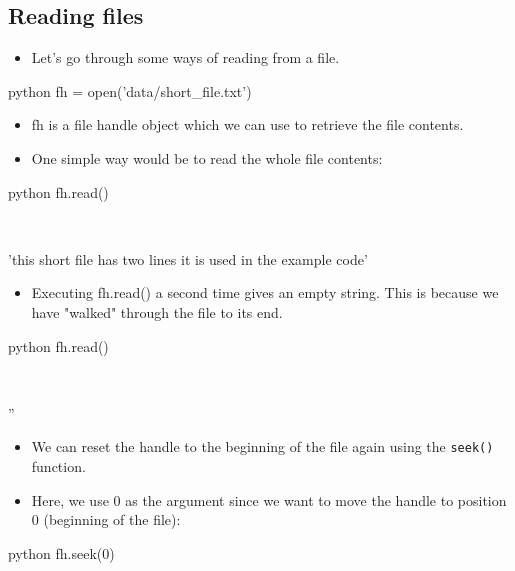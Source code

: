 \documentclass[aspectratio=1610,slidestop]{beamer}
\begin{document}
\subsection{Reading files}
\begin{pframe}
 \begin{itemize}
  \item Let's go through some ways of reading from a file.
 \end{itemize}
 \begin{ipython}
  \begin{pythonin}{python}
fh = open('data/short_file.txt')
  \end{pythonin}
 \end{ipython}

 \begin{itemize}
  \item fh is a file handle object which we can use to retrieve the file
  contents.
  \item One simple way would be to read the whole file contents:
 \end{itemize}
 \begin{ipython}
  \begin{pythonin}{python}
fh.read()
  \end{pythonin}
  \\
  \begin{pythonout}
'this short file has two lines it is used in the example code'
  \end{pythonout}
 \end{ipython}
\end{pframe}

\begin{pframe}
 \begin{itemize}
  \item Executing fh.read() a second time gives an empty string.
  This is because we have "walked" through the file to its end.
 \end{itemize}
 \vspace{-0.1cm}
 \begin{ipython}
  \begin{pythonin}{python}
fh.read()
  \end{pythonin}
  \\
  \begin{pythonout}
''
  \end{pythonout}
 \end{ipython}
 \begin{itemize}
  \item We can reset the handle to the beginning of the file again using the
  \texttt{seek()} function.
  \item Here, we use 0 as the argument since we want to move the handle to
  position 0 (beginning of the file):
 \end{itemize}
 \vspace{-0.1cm}
 \begin{ipython}
  \begin{pythonin}{python}
fh.seek(0)
  \end{pythonin}
 \end{ipython}
\end{pframe}
\end{document}
